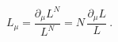 \begin{equation}
  \label{eq:Lscal}
  L_\mu = \frac{\partial_\mu L^N}{L^N} = N\,\frac{\partial_\mu L}{L}\ .
\end{equation}


